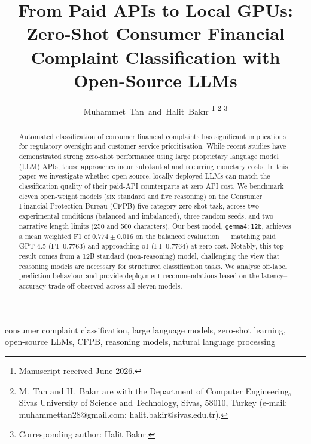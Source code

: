 \documentclass[journal]{IEEEtran}
\begin{document}
\title{From Paid APIs to Local GPUs: Zero-Shot Consumer Financial\\
Complaint Classification with Open-Source LLMs}

\author{Muhammet~Tan~and~Halit~Bak{\i}r%
\thanks{Manuscript received June 2026.}%
\thanks{M.~Tan and H.~Bak{\i}r are with the Department of Computer
Engineering, Sivas University of Science and Technology, Sivas, 58010,
Turkey (e-mail: muhammettan28@gmail.com; halit.bakir@sivas.edu.tr).}%
\thanks{Corresponding author: Halit Bak{\i}r.}%
}

\maketitle

\begin{abstract}
Automated classification of consumer financial complaints has significant
implications for regulatory oversight and customer service prioritisation.
While recent studies have demonstrated strong zero-shot performance using
large proprietary language model (LLM) APIs, those approaches incur
substantial and recurring monetary costs. In this paper we investigate
whether open-source, locally deployed LLMs can match the classification
quality of their paid-API counterparts at zero API cost. We benchmark
eleven open-weight models (six standard and five reasoning) on the
Consumer Financial Protection Bureau (CFPB) five-category zero-shot
task, across two experimental conditions (balanced and imbalanced),
three random seeds, and two narrative length limits (250 and 500
characters). Our best model, \texttt{gemma4:12b}, achieves a mean
weighted F1 of $0.774 \pm 0.016$ on the balanced evaluation — matching
paid GPT-4.5 (F1~0.7763) and approaching o1 (F1~0.7764) at zero cost.
Notably, this top result comes from a 12B standard (non-reasoning) model,
challenging the view that reasoning models are necessary for structured
classification tasks. We analyse off-label prediction behaviour and
provide deployment recommendations based on the latency–accuracy
trade-off observed across all eleven models.
\end{abstract}

\begin{IEEEkeywords}
consumer complaint classification, large language models, zero-shot
learning, open-source LLMs, CFPB, reasoning models, natural language processing
\end{IEEEkeywords}
\end{document}
